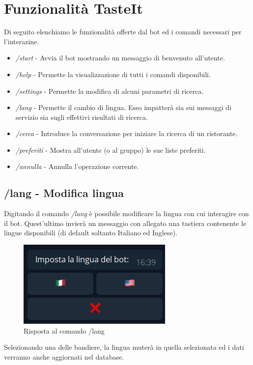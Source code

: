 \documentclass[a4paper, 12pt]{article}
\begin{document}
	\section{Funzionalità TasteIt}
	Di seguito elenchiamo le funzionalità offerte dal bot ed i comandi necessari per l'interazine.
	\begin{itemize}
		\item \textit{/start} - Avvia il bot mostrando un messaggio di benvenuto all'utente.
		\item \textit{/help} - Permette la visualizzazione di tutti i comandi disponibili.
		\item \textit{/settings} - Permette la modifica di alcuni parametri di ricerca.
		\item \textit{/lang} - Permette il cambio di lingua. Esso impatterà sia sui messaggi di servizio sia sugli effettivi risultati di ricerca.
		\item \textit{/cerca} - Introduce la conversazione per iniziare la ricerca di un ristorante.
		\item \textit{/preferiti} - Mostra all'utente (o al gruppo) le sue liste preferiti.
		\item \textit{/annulla} - Annulla l'operazione corrente.
	\end{itemize}
	
	\subsection{/lang - Modifica lingua}
	Digitando il comando \textit{/lang} è possibile modificare la lingua con cui interagire con il bot. Quest'ultimo invierà un messaggio con allegato una tastiera contenente le lingue disponibili (di default soltanto Italiano ed Inglese).
	
	\begin{figure}[h!]
		\centering
		\includegraphics[scale=1.1]{langCommand.png}
		\caption{Risposta al comando /lang}
	\end{figure}

	Selezionando una delle bandiere, la lingua muterà in quella selezionata ed i dati verranno anche aggiornati nel database.
	
\end{document}
